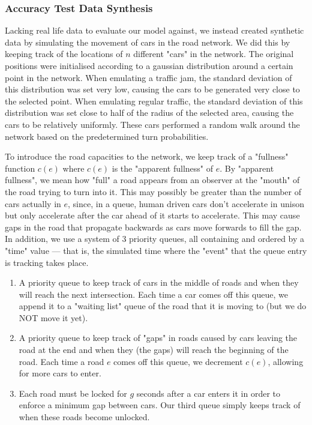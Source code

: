 \documentclass[a4paper]{article}
\begin{document}
\subsubsection{Accuracy Test Data Synthesis}
Lacking real life data to evaluate our model against, we instead created synthetic data by simulating the movement of cars in the road network.
We did this by keeping track of the locations of $n$ different "cars" in the network. 
The original positions were initialised according to a gaussian distribution around a certain point in the network.
When emulating a traffic jam, the standard deviation of this distribution was set very low, causing the cars to be generated very close to the selected point.
When emulating regular traffic, the standard deviation of this distribution was set close to half of the radius of the selected area,
causing the cars to be relatively uniformly.
These cars performed a random walk around the network based on the predetermined turn probabilities. %

To introduce the road capacities to the network, we keep track of a "fullness" function $c(e)$ where $c(e)$ is the "apparent fullness" of $e$.
By "apparent fullness", we mean how "full" a road appears from an observer at the "mouth" of the road trying to turn into it. This may possibly be greater than
the number of cars actually in $e$, since, in a queue, human driven cars don't accelerate in unison but only accelerate after the car ahead of it starts to accelerate.
This may cause gaps in the road that propagate backwards as cars move forwards to fill the gap.
In addition, we use a system of 3 priority queues, all containing and ordered by a "time" value --- that is, the
simulated time where the "event" that the queue entry is tracking takes place.
\begin{enumerate}
	\item A priority queue to keep track of cars in the middle of roads and when they will reach the next intersection. Each time a car comes off this queue, we append it
		to a "waiting list" queue of the road that it is moving to (but we do NOT move it yet).
	\item A priority queue to keep track of "gaps" in roads caused by cars leaving the road at the end and when they (the gaps) will reach the beginning of the road. 
		Each time a road $e$ comes off this queue, we decrement $c(e)$, allowing for more cars to enter.
	\item Each road must be locked for $g$ seconds after a car enters it in order to enforce a minimum gap between cars. Our third queue simply
		keeps track of when these roads become unlocked.
\end{enumerate}
\end{document}
